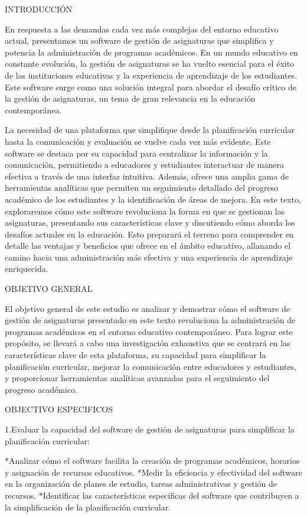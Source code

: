 INTRODUCCIÓN

En respuesta a las demandas cada vez más complejas del entorno educativo actual, presentamos un software de gestión de
asignaturas que simplifica y potencia la administración de programas académicos. En un mundo educativo en constante
evolución, la gestión de asignaturas se ha vuelto esencial para el éxito de las instituciones educativas y la experiencia
de aprendizaje de los estudiantes. Este software surge como una solución integral para abordar el desafío crítico de la 
gestión de asignaturas, un tema de gran relevancia en la educación contemporánea.

La necesidad de una plataforma que simplifique desde la planificación curricular hasta la comunicación y
evaluación se vuelve cada vez más evidente. Este software se destaca por su capacidad para centralizar la información
y la comunicación, permitiendo a educadores y estudiantes interactuar de manera efectiva a través de una interfaz
intuitiva. Además, ofrece una amplia gama de herramientas analíticas que permiten un seguimiento detallado del progreso
académico de los estudiantes y la identificación de áreas de mejora. En este texto, exploraremos cómo este
software revoluciona la forma en que se gestionan las asignaturas, presentando sus características clave y discutiendo
cómo aborda los desafíos actuales en la educación. Esto preparará el terreno para comprender en detalle las ventajas y
beneficios que ofrece en el ámbito educativo, allanando el camino hacia una administración más efectiva y una
experiencia de aprendizaje enriquecida.


OBJETIVO GENERAL


El objetivo general de este estudio es analizar y demostrar cómo el software de gestión de asignaturas presentado en este texto
revoluciona la administración de programas académicos en el entorno educativo contemporáneo. Para lograr este propósito, se llevará a
cabo una investigación exhaustiva que se centrará en las características clave de esta plataforma, su capacidad para simplificar la
planificación curricular, mejorar la comunicación entre educadores y estudiantes, y proporcionar herramientas analíticas avanzadas para
el seguimiento del progreso académico. 

OBJECTIVO ESPECIFICOS 

1.Evaluar la capacidad del software de gestión de asignaturas para simplificar la planificación curricular:

*Analizar cómo el software facilita la creación de programas académicos, horarios y asignación de recursos educativos.
*Medir la eficiencia y efectividad del software en la organización de planes de estudio, tareas administrativas y gestión de recursos.
*Identificar las características específicas del software que contribuyen a la simplificación de la planificación curricular.

